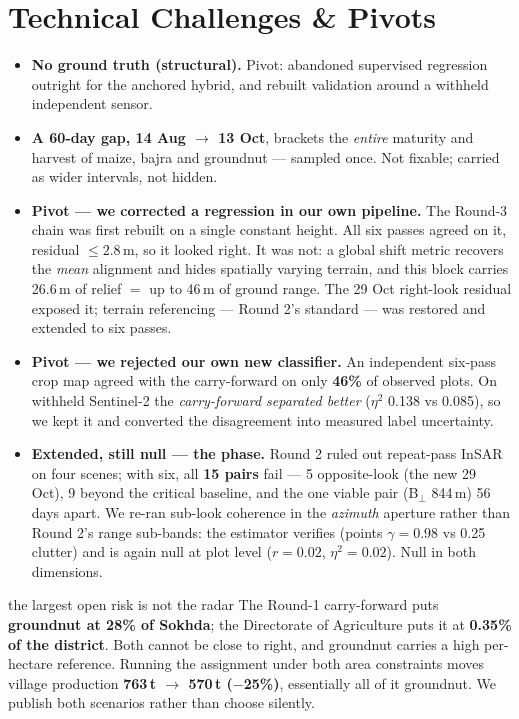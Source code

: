 \documentclass[9pt,a4paper,twocolumn]{extarticle}
\begin{document}
\section{Technical Challenges \& Pivots}
\begin{itemize}
\item \textbf{No ground truth (structural).} Pivot: abandoned supervised regression outright for the
anchored hybrid, and rebuilt validation around a withheld independent sensor.
\item \textbf{A 60-day gap, 14 Aug $\to$ 13 Oct}, brackets the \emph{entire} maturity and harvest of
maize, bajra and groundnut — sampled once. Not fixable; carried as wider intervals, not hidden.
\item \textbf{Pivot — we corrected a regression in our own pipeline.} The Round-3 chain was first
rebuilt on a single constant height. All six passes agreed on it, residual ${\le}2.8$\,m, so it
looked right. It was not: a global shift metric recovers the \emph{mean} alignment and hides
spatially varying terrain, and this block carries 26.6\,m of relief $=$ up to 46\,m of ground range.
The 29 Oct right-look residual exposed it; terrain referencing — Round 2's standard — was restored
and extended to six passes.
\item \textbf{Pivot — we rejected our own new classifier.} An independent six-pass crop map agreed
with the carry-forward on only \textbf{46\%} of observed plots. On withheld Sentinel-2 the
\emph{carry-forward separated better} ($\eta^2$ 0.138 vs 0.085), so we kept it and converted the
disagreement into measured label uncertainty.
\item \textbf{Extended, still null — the phase.} Round 2 ruled out repeat-pass InSAR on four scenes;
with six, all \textbf{15 pairs} fail — 5 opposite-look (the new 29 Oct), 9 beyond the critical
baseline, and the one viable pair (B$_\perp$ 844\,m) 56 days apart. We re-ran sub-look coherence in
the \emph{azimuth} aperture rather than Round 2's range sub-bands: the estimator verifies (points
$\gamma{=}0.98$ vs 0.25 clutter) and is again null at plot level ($r{=}0.02$, $\eta^2{=}0.02$). Null
in both dimensions.
\end{itemize}

\begin{callout}{the largest open risk is not the radar}
The Round-1 carry-forward puts \textbf{groundnut at 28\% of Sokhda}; the Directorate of Agriculture
puts it at \textbf{0.35\% of the district}. Both cannot be close to right, and groundnut carries a
high per-hectare reference. Running the assignment under both area constraints moves village
production \textbf{763\,t $\to$ 570\,t ($-$25\%)}, essentially all of it groundnut. We publish both
scenarios rather than choose silently.
\end{callout}
\end{document}
